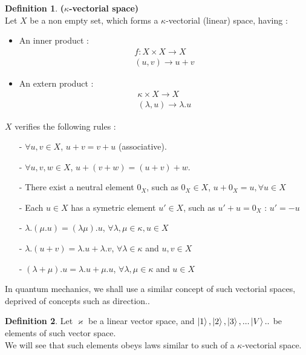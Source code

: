 \documentclass[11pt]{article}
\theoremstyle{definition}
\newtheorem{definition}{Definition}[section]
\numberwithin{equation}{section}
\begin{document}
\theoremstyle{definition}
\begin{definition}{\textbf{($\kappa$-vectorial space)}}\\
  Let $X$ be a non empty set, which forms a $\kappa$-vectorial (linear) space, having :
  \begin{itemize} \itemsep -4pt
  \item An inner product :
    \begin{align*}
    f : X \times X \to X \\
    (u, v) \to u + v
    \end{align*}
  \item An extern product :
    \begin{align*}
    \kappa \times X \to X \\ 
    (\lambda , u) \to \lambda . u
    \end{align*}
  \end{itemize}

  $X$ verifies the following rules :
  \begin{itemize} \itemsep -4pt
  \item[-] $\forall u, v \in X$, $u + v = v + u$ (associative).
  \item[-] $\forall u, v, w \in X$, $ u + ( v + w) = ( u + v ) + w $.
  \item[-] There exist a neutral element $0_X$, such as $0_X \in X$, $ u + 0_X = u, \forall u \in X$
  \item[-] Each $u \in X$ has a symetric element $u' \in X$, such as $ u' + u = 0_X$ : $u'= -u$
  \item[-] $\lambda.(\mu.u) = (\lambda \mu). u$, $\forall \lambda, \mu \in \kappa, u \in X$
  \item[-] $\lambda.(u+v) = \lambda.u + \lambda.v$, $\forall \lambda \in \kappa$ and $u, v \in X $
  \item[-] $ (\lambda + \mu).u = \lambda.u + \mu.u$, $\forall \lambda, \mu \in \kappa$ and $u \in X$  
  \end{itemize} 
\end{definition}

In quantum mechanics, we shall use a similar concept of such vectorial spaces, deprived of concepts
such as direction.. 
\medskip
\begin{definition}
  Let $\varkappa$ be a linear vector space, and $\ket{1},\ket{2}, \ket{3},...\ket{V}..$ be elements of such
  vector space.\\
  We will see that such elements obeys laws similar to such of a $\kappa$-vectorial space.
  \end{definition}
\end{document}
